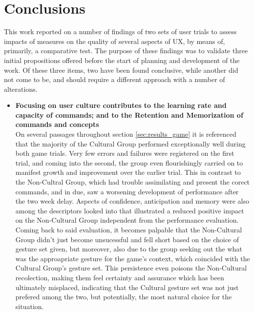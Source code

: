 \section{Conclusions} \label{sec:results_Conclusions}
    This work reported on a number of findings of two sets of user trials to assess impacts of measures on the quality of several aspects of UX, by means of, primarily, a comparative test. The purpose of these findings was to validate three initial propositions offered before the start of planning and development of the work. Of these three items, two have been found conclusive, while another did not come to be, and should require a different approach with a number of alterations.\\
    \begin{itemize}
        \item \textbf{Focusing on user culture contributes to the learning rate and capacity of commands; and to the Retention and Memorization of commands and concepts}\\
            On several passages throughout section \ref{sec:results_game} it is referenced that the majority of the Cultural Group performed exceptionally well during both game trials. Very few errors and failures were registered on the first trial, and coming into the second, the group even flourishingly carried on to manifest growth and improvement over the earlier trial. This in contrast to the Non-Cultral Group, which had trouble assimilating and present the corect commands, and in due, saw a worsening development of performance after the two week delay. Aspects of confidence, anticipation and memory were also among the descriptors looked into that illustrated a reduced positive impact on the Non-Cultural Group independent from the performance evaluation. Coming back to said evaluation, it becomes palpable that the Non-Cultural Group didn't just become unsucessful and fell short based on the choice of gesture set given, but moreover, also due to the group seeking out the what was the approapriate gesture for the game's context, which coincided with the Cultural Group's gesture set. This persistence even poisons the Non-Cultural recolection, making them feel certainty and assurance which has been ultimately misplaced, indicating that the Cultural gesture set was not just prefered among the two, but potentially, the most natural choice for the situation.
            

\end{itemize}
